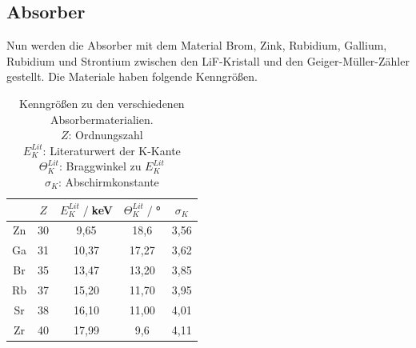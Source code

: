 \subsection{Absorber}
Nun werden die Absorber mit dem Material Brom, Zink, Rubidium, Gallium, Rubidium und Strontium
zwischen den LiF-Kristall und den Geiger-Müller-Zähler gestellt.
Die Materiale haben folgende Kenngrößen.
\begin{table}
    \centering
    \begin{tabular}{c | c c c c}
        \toprule
        &$Z$ & $E_K^{Lit}\;/\;$keV & $\Theta_K^{Lit}\;/\;$° & $\sigma_K$\\
        \midrule
        Zn & 30 & 9,65 & 18,6 & 3,56\\
        Ga & 31 & 10,37 & 17,27 &3,62\\
        Br & 35 & 13,47 & 13,20 &3,85\\
        Rb & 37 & 15,20 & 11,70 &3,95\\
        Sr & 38 & 16,10 & 11,00 &4,01\\
        Zr & 40 & 17,99 & 9,6 & 4,11\\
        \bottomrule
    \end{tabular}
    \caption{Kenngrößen zu den verschiedenen Absorbermaterialien.\cite{Absorptionskanten}\\
    $Z$: Ordnungszahl\\
    $E_K^{Lit}$: Literaturwert der K-Kante\cite{Absorptionskanten}\\
    $\Theta_K^{Lit}$: Braggwinkel zu $E_K^{Lit}$\\
    $\sigma_K$: Abschirmkonstante}
    \label{tab:kenngroesse}
\end{table}


